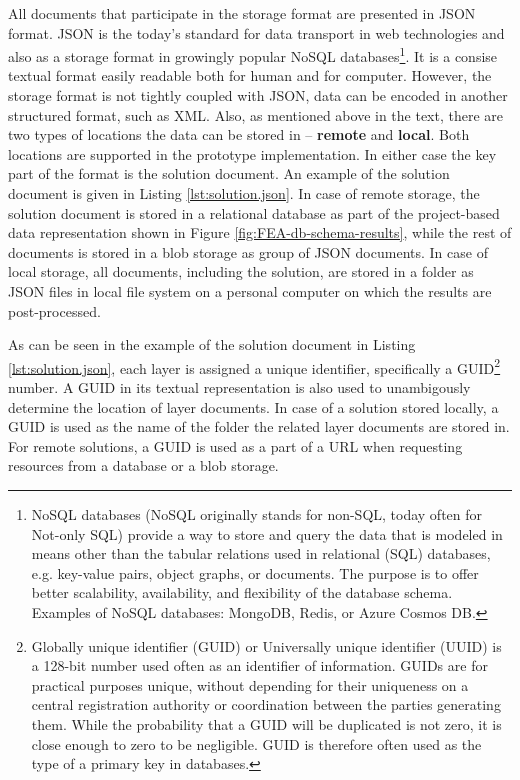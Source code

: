 All documents that participate in the storage format are presented in JSON format. JSON is the today's standard for data transport in web technologies and also as a storage format in growingly popular NoSQL databases\footnote{NoSQL databases (NoSQL originally stands for non-SQL, today often for Not-only SQL) provide a way to store and query the data that is modeled in means other than the tabular relations used in relational (SQL) databases, e.g. key-value pairs, object graphs, or documents. The purpose is to offer better scalability, availability, and flexibility of the database schema. Examples of NoSQL databases: MongoDB, Redis, or Azure Cosmos DB.}. It is a consise textual format easily readable both for human and for computer. However, the storage format is not tightly coupled with JSON, data can be encoded in another structured format, such as XML. Also, as mentioned above in the text, there are two types of locations the data can be stored in -- \textbf{remote} and \textbf{local}. Both locations are supported in the prototype implementation. In either case the key part of the format is the solution document. An example of the solution document is given in Listing \ref{lst:solution.json}. In case of remote storage, the solution document is stored in a relational database as part of the project-based data representation shown in Figure \ref{fig:FEA-db-schema-results}, while the rest of documents is stored in a blob storage as group of JSON documents. In case of local storage, all documents, including the solution, are stored in a folder as JSON files in local file system on a personal computer on which the results are post-processed.

As can be seen in the example of the solution document in Listing \ref{lst:solution.json}, each layer is assigned a unique identifier, specifically a GUID\footnote{Globally unique identifier (GUID) or Universally unique identifier (UUID) is a 128-bit number used often as an identifier of information. GUIDs are for practical purposes unique, without depending for their uniqueness on a central registration authority or coordination between the parties generating them. While the probability that a GUID will be duplicated is not zero, it is close enough to zero to be negligible. GUID is therefore often used as the type of a primary key in databases.} number. A GUID in its textual representation is also used to unambigously determine the location of layer documents. In case of a solution stored locally, a GUID is used as the name of the folder the related layer documents are stored in. For remote solutions, a GUID is used as a part of a URL when requesting resources from a database or a blob storage.

